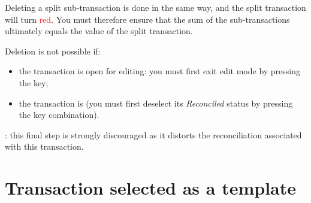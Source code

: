Deleting a split sub-transaction is done in the same way, and the split transaction will turn \textcolor{red}{red}. You must therefore ensure that the sum of the sub-transactions ultimately equals the value of the split transaction.

Deletion is not possible if:
\begin{itemize}
	\item the transaction is open for editing: you must first exit edit mode by pressing the  key;
	\item the transaction is  (you must first deselect its \emph{Reconciled} status by pressing the  key combination).
\end{itemize}

\Attention{}: this final step is strongly discouraged as it distorts the reconciliation associated with this transaction.


\section{Transaction selected as a template\label{transactions-model}}

